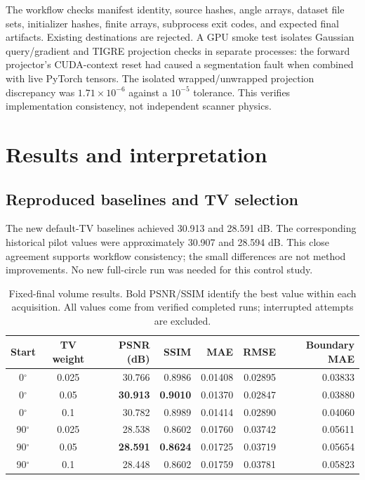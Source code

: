 \documentclass[10pt,a4paper]{article}
\begin{document}
The workflow checks manifest identity, source hashes, angle arrays, dataset file sets, initializer hashes, finite arrays, subprocess exit codes, and expected final artifacts. Existing destinations are rejected. A GPU smoke test isolates Gaussian query/gradient and TIGRE projection checks in separate processes: the forward projector's CUDA-context reset had caused a segmentation fault when combined with live PyTorch tensors. The isolated wrapped/unwrapped projection discrepancy was $1.71\times10^{-6}$ against a $10^{-5}$ tolerance. This verifies implementation consistency, not independent scanner physics.

\section{Results and interpretation}
\subsection{Reproduced baselines and TV selection}
The new default-TV baselines achieved 30.913 and 28.591 dB. The corresponding historical pilot values were approximately 30.907 and 28.594 dB. This close agreement supports workflow consistency; the small differences are not method improvements. No new full-circle run was needed for this control study.

\begin{table}[H]
\centering\small
\caption{Fixed-final volume results. Bold PSNR/SSIM identify the best value within each acquisition. All values come from verified completed runs; interrupted attempts are excluded.}
\begin{tabular}{ccrrrrr}
\toprule
Start & TV weight & PSNR (dB) & SSIM & MAE & RMSE & Boundary MAE\\
\midrule
0$^\circ$ & 0.025 & 30.766 & 0.8986 & 0.01408 & 0.02895 & 0.03833\\
0$^\circ$ & 0.05 & \textbf{30.913} & \textbf{0.9010} & 0.01370 & 0.02847 & 0.03880\\
0$^\circ$ & 0.1 & 30.782 & 0.8989 & 0.01414 & 0.02890 & 0.04060\\
\midrule
90$^\circ$ & 0.025 & 28.538 & 0.8602 & 0.01760 & 0.03742 & 0.05611\\
90$^\circ$ & 0.05 & \textbf{28.591} & \textbf{0.8624} & 0.01725 & 0.03719 & 0.05654\\
90$^\circ$ & 0.1 & 28.448 & 0.8602 & 0.01759 & 0.03781 & 0.05823\\
\bottomrule
\end{tabular}
\end{table}
\end{document}
